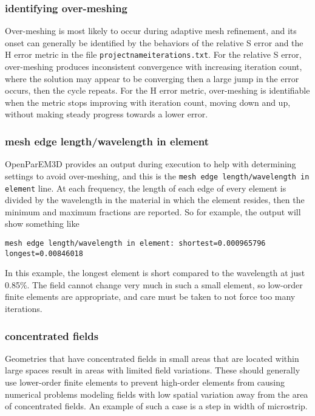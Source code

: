\documentclass[titlepage]{article}
\renewcommand\_{\textunderscore\linebreak[1]}
\begin{document}
\subsubsection{identifying over-meshing}

Over-meshing is most likely to occur during adaptive mesh refinement, and its onset can generally be identified by  the behaviors of the relative S error and the H error metric in the file \texttt{projectname\_iterations.txt}.  For the relative S error, over-meshing produces inconsistent convergence with increasing iteration count, where the solution may appear to be converging then a large jump in the error occurs, then the cycle repeats.  For the H error metric, over-meshing is identifiable when the metric stops improving with iteration count, moving down and up, without making steady progress towards a lower error.  

\subsubsection{mesh edge length/wavelength in element}

OpenParEM3D provides an output during execution to help with determining settings to avoid over-meshing, and this is the \texttt{mesh edge length/wavelength in element} line.  At each frequency, the length of each edge of every element is divided by the wavelength in the material in which the element resides, then the minimum and maximum fractions are reported.  So for example, the output will show something like
\begin{Verbatim}[fontsize=\small]
    mesh edge length/wavelength in element: shortest=0.000965796 longest=0.00846018
\end{Verbatim}
In this example, the longest element is short compared to the wavelength at just 0.85\%.  The field cannot change very much in such a small element, so low-order finite elements are appropriate, and care must be taken to not force too many iterations.

\subsubsection{concentrated fields}

Geometries that have concentrated fields in small areas that are located within large spaces result in areas with limited field variations.  These should generally use lower-order finite elements to prevent high-order elements from causing numerical problems modeling fields with low spatial variation away from the area of concentrated fields.  An example of such a case is a step in width of microstrip.
\end{document}
